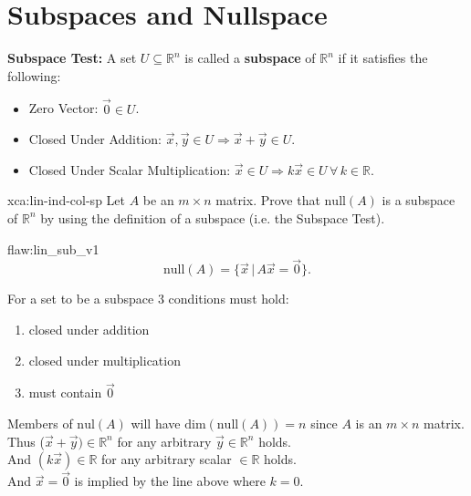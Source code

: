 \section{Subspaces and Nullspace}

\textbf{Subspace Test:} A set $U\subseteq\mathbb{R}^n$ is called a \textbf{subspace} of $\mathbb{R}^n$ if it satisfies the following:
\begin{itemize}
\item Zero Vector: $\vec{0}\in U$.
\item Closed Under Addition: $\vec{x},\vec{y}\in U \Rightarrow\vec{x}+\vec{y}\in U$.
\item Closed Under Scalar Multiplication: $\vec{x}\in U \Rightarrow k\vec{x}\in U \, \forall \, k\in\mathbb{R}$.
\end{itemize}

\begin{xca}{xca:lin-ind-col-sp}
Let $A$ be an $m\times n$ matrix. Prove that $\mathrm{null}(A)$ is a subspace of $\mathbb{R}^n$ by using the definition of a subspace (i.e. the Subspace Test).
\end{xca}

\begin{flaw}{flaw:lin_sub_v1}
\[\mathrm{null}(A)=\{\vec{x}\,|\,A\vec{x}=\vec{0}\}.\]

For a set to be a subspace 3 conditions must hold:

\begin{enumerate}
\item closed under addition
\item closed under multiplication
\item must contain $\vec{0}$
\end{enumerate}

Members of $\mathrm{nul}(A)$ will have $\mathrm{dim}(\mathrm{null}(A))=n$ since $A$ is an $m\times n$ matrix. \\

Thus ($\vec{x}+\vec{y})\in\mathbb{R}^n$ for any arbitrary $\vec{y}\in\mathbb{R}^n$ holds. \\

And $(k\vec{x})\in\mathbb{R}$ for any arbitrary scalar $\in\mathbb{R}$ holds. \\

And $\vec{x}=\vec{0}$ is implied by the line above where $k=0$.

\end{flaw}

